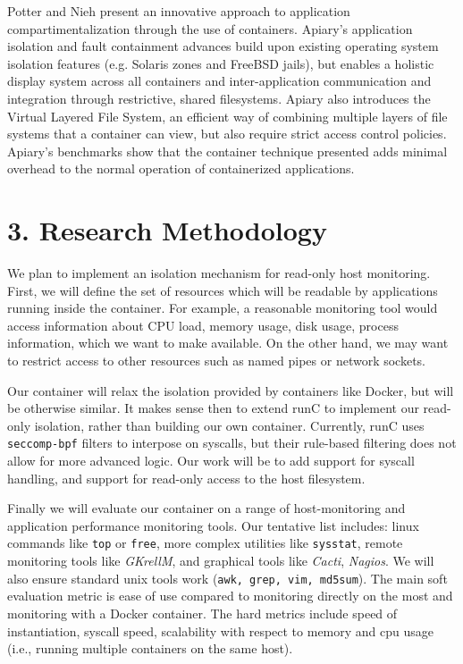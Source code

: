 \documentclass{proc}
\begin{document}
Potter and Nieh \cite{potter2010apiary} present an innovative approach to application compartimentalization through the use of containers. Apiary's application isolation and fault containment advances build upon existing operating system isolation features (e.g. Solaris zones and FreeBSD jails), but enables a holistic display system across all containers and inter-application communication and integration through restrictive, shared filesystems. Apiary also introduces the Virtual Layered File System, an efficient way of combining multiple layers of file systems that a container can view, but also require strict access control policies. Apiary's benchmarks show that the container technique presented adds minimal overhead to the normal operation of containerized applications.


\section*{3. Research Methodology}
We plan to implement an isolation mechanism for read-only host monitoring. First, we will define the set of resources which will be readable by applications running inside the container. For example, a reasonable monitoring tool would access information about CPU load, memory usage, disk usage, process information, which we want to make available. On the other hand, we may want to restrict access to other resources such as named pipes or network sockets.

Our container will relax the isolation provided by containers like Docker, but will be otherwise similar. It makes sense then to extend runC to implement our read-only isolation, rather than building our own container. Currently, runC uses \texttt{seccomp-bpf} filters to interpose on syscalls, but their rule-based filtering does not allow for more advanced logic. Our work will be to add support for syscall handling, and support for read-only access to the host filesystem. 

Finally we will evaluate our container on a range of host-monitoring and application performance monitoring tools. Our tentative list includes: linux commands like \texttt{top} or \texttt{free}, more complex utilities like \texttt{sysstat}\cite{sysstat}, remote monitoring tools like \emph{GKrellM}\cite{gkrellm}, and graphical tools like \emph{Cacti}\cite{cacti}, \emph{Nagios}\cite{nagios}. We will also ensure standard unix tools work (\texttt{awk, grep, vim, md5sum}). The main soft evaluation metric is ease of use compared to monitoring directly on the most and monitoring with a Docker container. The hard metrics include speed of instantiation, syscall speed, scalability with respect to memory and cpu usage (i.e., running multiple containers on the same host). 
\end{document}
